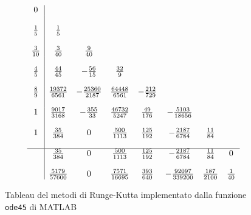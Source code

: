 \begin{figure}[htb]
$$\begin{array}{c|ccccccc}
0					&									&									&									&								&											&						&		\\ \\
\frac{1}{5}	&	\frac{1}{5}				&									&									&								&											&						&		\\ \\
\frac{3}{10}	&	\frac{3}{40}				&	\frac{9}{40}				&									&								&											&						&		\\ \\
\frac{4}{5}	&	\frac{44}{45}			&	-\frac{56}{15}			&	\frac{32}{9}				&								&											&						&		\\ \\
\frac{8}{9}	&	\frac{19372}{6561}	&	-\frac{25360}{2187}&	\frac{64448}{6561}	&	-\frac{212}{729}	&											&						&		\\ \\
1					&	\frac{9017}{3168}	&	-\frac{355}{33}		&	\frac{46732}{5247}	&	\frac{49}{176}		&	-\frac{5103}{18656}		&						&		\\ \\
1					&	\frac{35}{384}			&	0								&	\frac{500}{1113}		&	\frac{125}{192	}	&-\frac{2187}{6784}			&	\frac{11}{84}	&		\\	\\		
\hline
					&	\frac{35}{384}			&	0								&	\frac{500}{1113}		&	\frac{125}{192}	&-\frac{2187}{6784}			&	\frac{11}{84}	&	0	\\ \\
				&	\frac{5179}{57600}	&	0						&	\frac{7571}{16695}	&	\frac{393}{640}		&	-\frac{92097}{339200}	&	\frac{187}{2100}	&	\frac{1}{40}
\end{array}$$
\caption{Tableau del metodi di Runge-Kutta implementato dalla funzione \texttt{ode45} di MATLAB}
\label{fig::ode45}
\end{figure}
